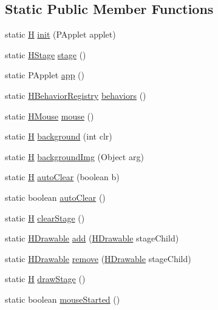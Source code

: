 \subsection*{Static Public Member Functions}
\begin{DoxyCompactItemize}
\item 
static \hyperlink{classhype_1_1util_1_1_h}{H} \hyperlink{classhype_1_1util_1_1_h_a715d0295b19cd87c4abd31649874e2db}{init} (P\-Applet applet)
\item 
static \hyperlink{classhype_1_1drawable_1_1_h_stage}{H\-Stage} \hyperlink{classhype_1_1util_1_1_h_a546fb07e757b926d3d35c9df84344fb3}{stage} ()
\item 
static P\-Applet \hyperlink{classhype_1_1util_1_1_h_af3feb9f401a52531f8e9863b6037bca7}{app} ()
\item 
static \hyperlink{classhype_1_1behavior_1_1_h_behavior_registry}{H\-Behavior\-Registry} \hyperlink{classhype_1_1util_1_1_h_a15be690e44f0bff8993dd56076533049}{behaviors} ()
\item 
static \hyperlink{classhype_1_1event_1_1_h_mouse}{H\-Mouse} \hyperlink{classhype_1_1util_1_1_h_acd583485bc081dad1348a972c1451272}{mouse} ()
\item 
static \hyperlink{classhype_1_1util_1_1_h}{H} \hyperlink{classhype_1_1util_1_1_h_a0470663ee53fc2608a63b1c2467d1e9a}{background} (int clr)
\item 
static \hyperlink{classhype_1_1util_1_1_h}{H} \hyperlink{classhype_1_1util_1_1_h_a52d44145dedccfdc092bab8a58e82117}{background\-Img} (Object arg)
\item 
static \hyperlink{classhype_1_1util_1_1_h}{H} \hyperlink{classhype_1_1util_1_1_h_a70d309725aff47fd409068afd9f98e6c}{auto\-Clear} (boolean b)
\item 
static boolean \hyperlink{classhype_1_1util_1_1_h_aed6de8e139822d3963f7739473d8dc03}{auto\-Clear} ()
\item 
static \hyperlink{classhype_1_1util_1_1_h}{H} \hyperlink{classhype_1_1util_1_1_h_a43a611cbbd42c6cb0577bff6c38ab710}{clear\-Stage} ()
\item 
static \hyperlink{classhype_1_1drawable_1_1_h_drawable}{H\-Drawable} \hyperlink{classhype_1_1util_1_1_h_a3369a46149acaf9b543c5bafb438499e}{add} (\hyperlink{classhype_1_1drawable_1_1_h_drawable}{H\-Drawable} stage\-Child)
\item 
static \hyperlink{classhype_1_1drawable_1_1_h_drawable}{H\-Drawable} \hyperlink{classhype_1_1util_1_1_h_adc69ac14d009920ee93d1915d71f76c9}{remove} (\hyperlink{classhype_1_1drawable_1_1_h_drawable}{H\-Drawable} stage\-Child)
\item 
static \hyperlink{classhype_1_1util_1_1_h}{H} \hyperlink{classhype_1_1util_1_1_h_a5a565f90bd0a25e12079af9b7cbc8138}{draw\-Stage} ()
\item 
static boolean \hyperlink{classhype_1_1util_1_1_h_a2c6f5ff8a14884977bac3324592e1a60}{mouse\-Started} ()
\end{DoxyCompactItemize}
